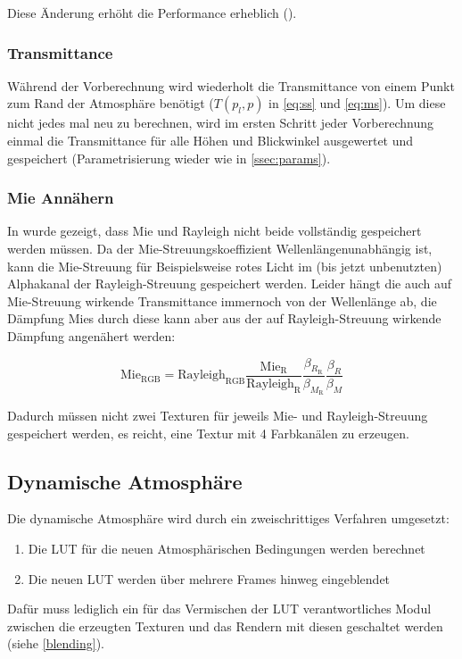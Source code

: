 Diese Änderung erhöht die Performance erheblich (\cite{Bodare14}). 

\subsubsection{Transmittance}
Während der Vorberechnung wird wiederholt die Transmittance von einem Punkt zum Rand der Atmosphäre benötigt ($T(p_l,
p)$ in \cref{eq:ss} und \cref{eq:ms}). Um diese nicht jedes mal neu zu berechnen, wird im ersten Schritt jeder
Vorberechnung einmal die Transmittance für alle Höhen und Blickwinkel ausgewertet und gespeichert (Parametrisierung
wieder wie in \cref{ssec:params}).

\subsubsection{Mie Annähern}
In \cite{Bruneton08} wurde gezeigt, dass Mie und Rayleigh nicht beide vollständig gespeichert werden müssen. Da der
Mie-Streuungskoeffizient Wellenlängenunabhängig ist, kann die Mie-Streuung für Beispielsweise rotes Licht im (bis jetzt
unbenutzten) Alphakanal der Rayleigh-Streuung gespeichert werden. Leider hängt die auch auf Mie-Streuung wirkende
Transmittance immernoch von der Wellenlänge ab, die Dämpfung Mies durch diese kann aber aus der auf Rayleigh-Streuung
wirkende Dämpfung angenähert werden:

\begin{equation*}
	\text{Mie}_\text{RGB}=\text{Rayleigh}_\text{RGB}
	\frac{\text{Mie}_\text{R}}{\text{Rayleigh}_\text{R}}
	\frac{\beta_{R_\text{R}}}{\beta_{M_\text{R}}}
	\frac{\beta_R}{\beta_M}
\end{equation*}

Dadurch müssen nicht zwei Texturen für jeweils Mie- und Rayleigh-Streuung gespeichert werden, es reicht, eine Textur mit
4 Farbkanälen zu erzeugen.

\subsection{Dynamische Atmosphäre}
Die dynamische Atmosphäre wird durch ein zweischrittiges Verfahren umgesetzt:
\begin{enumerate}
	\item Die LUT für die neuen Atmosphärischen Bedingungen werden berechnet
	\item Die neuen LUT werden über mehrere Frames hinweg eingeblendet
\end{enumerate}
Dafür muss lediglich ein für das Vermischen der LUT verantwortliches Modul zwischen die erzeugten Texturen und das
Rendern mit diesen geschaltet werden (siehe \cref{blending}).\\

